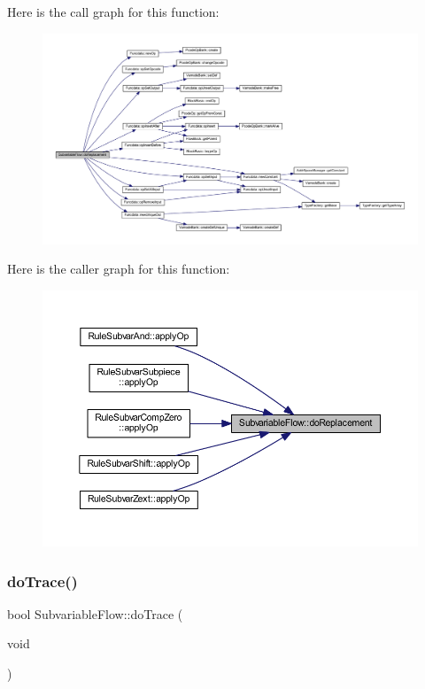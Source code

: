 Here is the call graph for this function\+:
\nopagebreak
\begin{figure}[H]
\begin{center}
\leavevmode
\includegraphics[width=350pt]{class_subvariable_flow_a75dd5e28aa46641f1561b1c51f0876c1_cgraph}
\end{center}
\end{figure}
Here is the caller graph for this function\+:
\nopagebreak
\begin{figure}[H]
\begin{center}
\leavevmode
\includegraphics[width=350pt]{class_subvariable_flow_a75dd5e28aa46641f1561b1c51f0876c1_icgraph}
\end{center}
\end{figure}
\mbox{\label{class_subvariable_flow_ad6b6ba93a3249ba31526a01198111496}} 
\subsubsection{\texorpdfstring{doTrace()}{doTrace()}}
{\footnotesize\ttfamily bool Subvariable\+Flow\+::do\+Trace (\begin{DoxyParamCaption}\item[{void}]{ }\end{DoxyParamCaption})}



